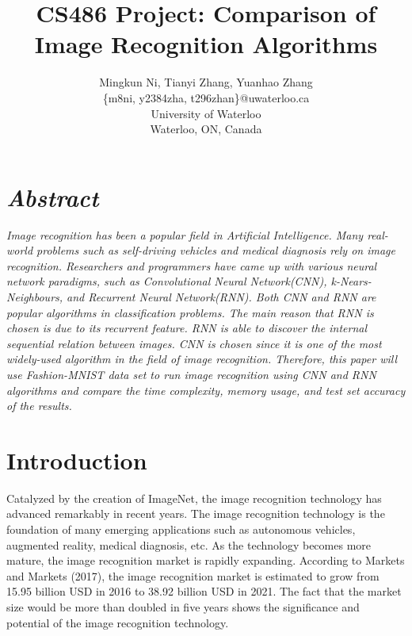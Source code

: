 \documentclass[letterpaper]{article} %
\begin{document}
%
\title{CS486 Project: Comparison of Image Recognition Algorithms}
\author{Mingkun Ni, Tianyi Zhang, Yuanhao Zhang\\
\{m8ni, y2384zha, t296zhan\}@uwaterloo.ca\\
University of Waterloo\\
Waterloo, ON, Canada\\
}
\maketitle


\section{\em{Abstract}}
\textit{Image recognition has been a popular field in Artificial Intelligence. Many real-world problems such as self-driving vehicles and medical diagnosis rely on image recognition. Researchers and programmers have came up with various neural network paradigms, such as Convolutional Neural Network(CNN), k-Nears-Neighbours, and Recurrent Neural Network(RNN). Both CNN and RNN are popular algorithms in classification problems. The main reason that RNN is chosen is due to its recurrent feature. RNN is able to discover the internal sequential relation between images. CNN is chosen since it is one of the most widely-used algorithm in the field of image recognition. Therefore, this paper will use Fashion-MNIST data set to run image recognition using CNN and RNN algorithms and compare the time complexity, memory usage, and test set accuracy of the results.}


\section{Introduction}

Catalyzed by the creation of ImageNet, the image recognition technology has advanced remarkably in recent years. The image recognition technology is the foundation of many emerging applications such as autonomous vehicles, augmented reality, medical diagnosis, etc. As the technology becomes more mature, the image recognition market is rapidly expanding. According to Markets and Markets (2017), the image recognition market is estimated to grow from 15.95 billion USD in 2016 to 38.92 billion USD in 2021. The fact that the market size would be more than doubled in five years shows the significance and potential of the image recognition technology. 
\end{document}
